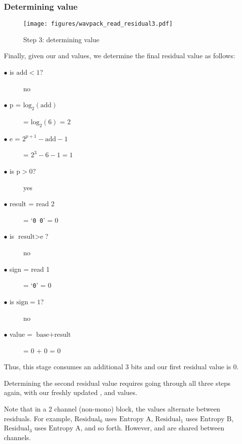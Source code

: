 \subsubsection{Determining value}
\begin{wrapfigure}[30]{r}{3in}
\texttt{[image: figures/wavpack\_read\_residual3.pdf]}
\caption{Step 3: determining value}
\end{wrapfigure}
Finally, given our  and  values, we
determine the final residual value as follows:
\begin{description}
\item[$\bullet$ is $\text{add} < 1$?] no
\item[$\bullet$ p = $\text{log}_2(\text{add})$] = $\text{log}_2(6)$ = 2
\item[$\bullet$ e = $2 ^ {p + 1} - \text{add} - 1$] = $2 ^ 3 - 6 - 1 = 1$
\item[$\bullet$ is $\text{p} > 0$?] yes
\item[$\bullet$ result = read 2] = `\texttt{0 0}' = 0
\item[$\bullet$ is $\text{result} > \text{e}$?] no
\item[$\bullet$ sign = read 1] = `\texttt{0}' = 0
\item[$\bullet$ is $\text{sign} = 1$?] no
\item[$\bullet$ value = $\text{base} + \text{result}$] = 0 + 0 = 0
\end{description}
Thus, this stage consumes an additional 3 bits and our first residual
value is 0.

Determining the second residual value requires going through all
three steps again, with our freshly updated ,
 and  values.

Note that in a 2 channel (non-mono) block,
the  values alternate between residuals.
For example,
$\text{Residual}_0$ uses $\text{Entropy A}$,
$\text{Residual}_1$ uses $\text{Entropy B}$,
$\text{Residual}_3$ uses $\text{Entropy A}$, and so forth.
However,  and  are shared
between channels.

\clearpage

